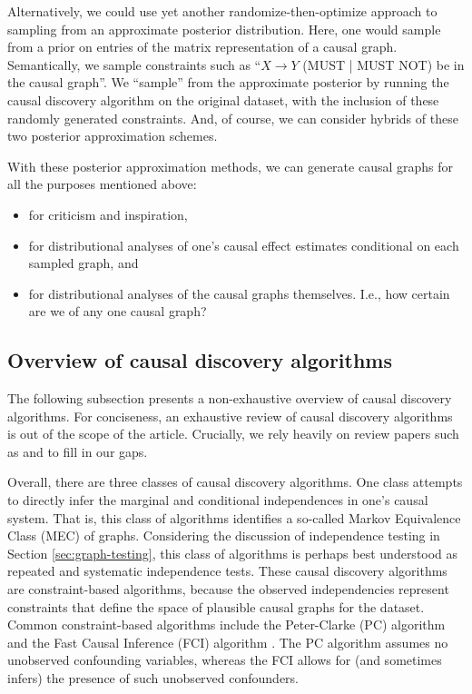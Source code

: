 Alternatively, we could use yet another randomize-then-optimize \citep{bardsley_2014_randomize, orabona_2014_measure} approach to sampling from an approximate posterior distribution.
Here, one would sample from a prior on entries of the matrix representation of a causal graph.
Semantically, we sample constraints such as ``$X \rightarrow Y$ (MUST | MUST NOT) be in the causal graph''.
We ``sample'' from the approximate posterior by running the causal discovery algorithm on the original dataset, with the inclusion of these randomly generated constraints.
And, of course, we can consider hybrids of these two posterior approximation schemes.

With these posterior approximation methods, we can generate causal graphs for all the purposes mentioned above:
\begin{itemize}
   \item for criticism and inspiration,
   \item for distributional analyses of one's causal effect estimates conditional on each sampled graph, and
   \item for distributional analyses of the causal graphs themselves.
   \newline
   I.e., how certain are we of any one causal graph?
\end{itemize}

\subsection{Overview of causal discovery algorithms}
\label{sec:discovery-overview}

The following subsection presents a non-exhaustive overview of causal discovery algorithms.
For conciseness, an exhaustive review of causal discovery algorithms is out of the scope of the article.
Crucially, we rely heavily on review papers such as \citet{glymour_2019_review} and \citet{spirtes_2016_causal} to fill in our gaps.


Overall, there are three classes of causal discovery algorithms.
One class attempts to directly infer the marginal and conditional independences in one's causal system.
That is, this class of algorithms identifies a so-called Markov Equivalence Class (MEC) of graphs.
Considering the discussion of independence testing in Section \ref{sec:graph-testing}, this class of algorithms is perhaps best understood as repeated and systematic independence tests.
These causal discovery algorithms are constraint-based algorithms, because the observed independencies represent constraints that define the space of plausible causal graphs for the dataset.
Common constraint-based algorithms include the Peter-Clarke (PC) algorithm and the Fast Causal Inference (FCI) algorithm \citep{glymour_2001_causation}.
The PC algorithm assumes no unobserved confounding variables, whereas the FCI allows for (and sometimes infers) the presence of such unobserved confounders.

